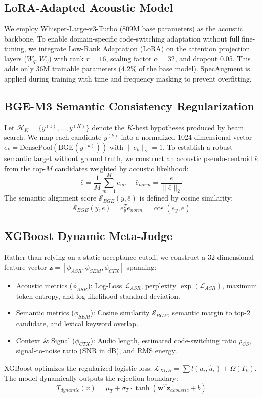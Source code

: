 \documentclass[9pt, conference, a4paper, compsocconf]{IEEEtran}
\begin{document}
\subsection{LoRA-Adapted Acoustic Model}
We employ Whisper-Large-v3-Turbo (809M base parameters) as the acoustic backbone. To enable domain-specific code-switching adaptation without full fine-tuning, we integrate Low-Rank Adaptation (LoRA) \cite{hu2022lora} on the attention projection layers ($W_q, W_v$) with rank $r=16$, scaling factor $\alpha=32$, and dropout 0.05. This adds only 36M trainable parameters (4.2\% of the base model). SpecAugment is applied during training with time and frequency masking to prevent overfitting.

\subsection{BGE-M3 Semantic Consistency Regularization}
Let $\mathcal{H}_K = \{y^{(1)}, \dots, y^{(K)}\}$ denote the $K$-best hypotheses produced by beam search. We map each candidate $y^{(k)}$ into a normalized 1024-dimensional vector $e_k = \text{DensePool}(\text{BGE}(y^{(k)}))$ with $\|e_k\|_2 = 1$. To establish a robust semantic target without ground truth, we construct an acoustic pseudo-centroid $\bar{e}$ from the top-$M$ candidates weighted by acoustic likelihood:
\begin{equation}
\bar{e} = \frac{1}{M} \sum_{m=1}^M e_m, \quad \bar{e}_{norm} = \frac{\bar{e}}{\|\bar{e}\|_2}
\end{equation}
The semantic alignment score $\mathcal{S}_{BGE}(y, \bar{e})$ is defined by cosine similarity:
\begin{equation}
\mathcal{S}_{BGE}(y, \bar{e}) = e_y^T \bar{e}_{norm} = \cos(e_y, \bar{e})
\end{equation}

\subsection{XGBoost Dynamic Meta-Judge}
Rather than relying on a static acceptance cutoff, we construct a 32-dimensional feature vector $\mathbf{z} = [\phi_{ASR}, \phi_{SEM}, \phi_{CTX}]$ spanning:
\begin{itemize}
    \item Acoustic metrics ($\phi_{ASR}$): Log-Loss $\mathcal{L}_{ASR}$, perplexity $\exp(\mathcal{L}_{ASR})$, maximum token entropy, and log-likelihood standard deviation.
    \item Semantic metrics ($\phi_{SEM}$): Cosine similarity $\mathcal{S}_{BGE}$, semantic margin to top-2 candidate, and lexical keyword overlap.
    \item Context \& Signal ($\phi_{CTX}$): Audio length, estimated code-switching ratio $\rho_{CS}$, signal-to-noise ratio (SNR in dB), and RMS energy.
\end{itemize}
XGBoost optimizes the regularized logistic loss: $\mathcal{L}_{XGB} = \sum l(u_i, \hat{u}_i) + \Omega(T_k)$. The model dynamically outputs the rejection boundary:
\begin{equation}
T_{dynamic}(x) = \mu_T + \sigma_T \cdot \tanh(\mathbf{w}^T \mathbf{z}_{acoustic} + b)
\end{equation}
\end{document}
